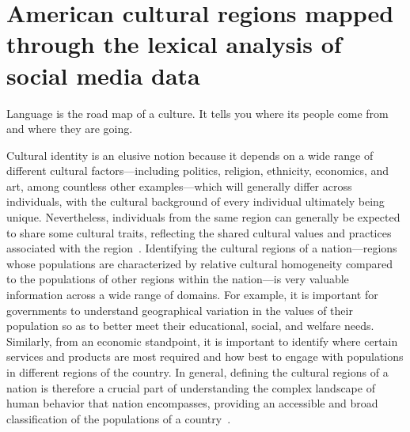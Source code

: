 \documentclass[../thesis.tex]{subfiles}
\begin{document}
\chapter{American cultural regions mapped through the lexical analysis of social media data}
\label{ch:acr}

\epigraph{
  Language is the road map of a culture. It tells you where its people come from and
  where they are going.
}{
}


Cultural identity is an elusive notion because it depends on a wide range of different
cultural factors---including politics, religion, ethnicity, economics, and art, among
countless other examples---which will generally differ across individuals, with the
cultural background of every individual ultimately being unique. Nevertheless,
individuals from the same region can generally be expected to share some cultural
traits, reflecting the shared cultural values and practices associated with the
region~\cite{broek1973geography}. Identifying the cultural regions of a nation---regions
whose populations are characterized by relative cultural homogeneity compared to the
populations of other regions within the nation---is very valuable information across a
wide range of domains. For example, it is important for governments to understand
geographical variation in the values of their population so as to better meet their
educational, social, and welfare needs. Similarly, from an economic standpoint, it is
important to identify where certain services and products are most required and how best
to engage with populations in different regions of the country. In general, defining the
cultural regions of a nation is therefore a crucial part of understanding the complex
landscape of human behavior that nation encompasses, providing an accessible and broad
classification of the populations of a country~\cite{lane2016culture}.
\end{document}
